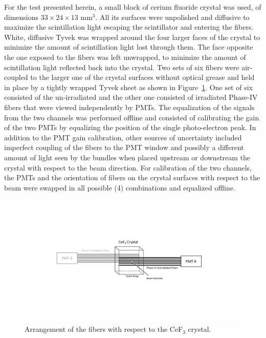 \documentclass[a4paper,11pt]{article}
\begin{document}
For the test presented herein, a small block of cerium fluoride crystal was used, of dimensions $33\times 24 \times13$ mm$^3$. All its surfaces were unpolished and diffusive to maximize the scintillation light escaping the scintillator and entering the fibers. White, diffusive Tyvek was wrapped around the four larger faces of the crystal to minimize the amount of scintillation light lost through them. The face opposite the one exposed to the fibers was left unwrapped, to minimize the amount of scintillation light reflected back into the crystal.  Two sets of six fibers were air-coupled to the larger one of the crystal surfaces without optical grease and held in place by a tightly wrapped Tyvek sheet as shown in Figure~\ref{fig:CeF3Arrangement}. One set of six consisted of the un-irradiated and the other one consisted of irradiated Phase-IV fibers that were viewed independently by PMTs. The equalization of the signals from the two channels was performed offline and consisted of calibrating the gain of the two PMTs by equalizing the position of the single photo-electron peak. In addition to the PMT gain calibration, other sources of uncertainty included imperfect coupling of the fibers to the PMT window and possibly a different amount of light seen by the bundles when placed upstream or downstream the crystal with respect to the beam direction. For calibration of the two channels, the PMTs and the orientation of fibers on the crystal surfaces with respect to the beam were swapped in all possible (4) combinations and equalized offline.
\begin{figure}[ht]
\begin{center}\vspace{-1pc}
      \includegraphics[width=10 cm]{Figures/CeF3Arrangement.pdf}
\caption{\small Arrangement of the fibers with respect to the CeF$_3$ crystal.}
    \label{fig:CeF3Arrangement}
\end{center}
\end{figure}
\end{document}
